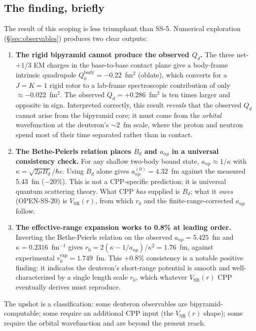 \documentclass[11pt,letterpaper]{article}
\newcommand{\Bd}{B_{d}}
\newcommand{\Qd}{Q_{d}}
\newcommand{\anp}{a_{np}}
\newcommand{\rzero}{r_{0}}
\newcommand{\VSR}{V_{\mathrm{SR}}}
\begin{document}
\subsection{The finding, briefly}

The result of this scoping is less triumphant than SS-5. Numerical exploration (§\ref{sec:observables}) produces two clear outputs:

\begin{enumerate}
\item \textbf{The rigid bipyramid cannot produce the observed $\Qd$.} The three net-$+1/3$ EM charges in the base-to-base contact plane give a body-frame intrinsic quadrupole $Q_0^{\mathrm{body}} = -0.22$~fm$^2$ (oblate), which converts for a $J=K=1$ rigid rotor to a lab-frame spectroscopic contribution of only $\approx -0.022$~fm$^2$. The observed $\Qd = +0.286$~fm$^2$ is ten times larger and opposite in sign. Interpreted correctly, this result \emph{reveals} that the observed $\Qd$ cannot arise from the bipyramid core; it must come from the \emph{orbital} wavefunction at the deuteron's ${\sim}2$~fm scale, where the proton and neutron spend most of their time separated rather than in contact.

\item \textbf{The Bethe-Peierls relation places $\Bd$ and $\anp$ in a universal consistency check.} For any shallow two-body bound state, $\anp \approx 1/\kappa$ with $\kappa = \sqrt{2\mu\Bd}/\hbar c$. Using $\Bd$ alone gives $\anp^{(0)} = 4.32$~fm against the measured 5.43~fm ($-20\%$). This is not a CPP-specific prediction; it is universal quantum scattering theory. What CPP \emph{has} supplied is $\Bd$; what it \emph{owes} (OPEN-SS-20) is $\VSR(r)$, from which $\rzero$ and the finite-range-corrected $\anp$ follow.

\item \textbf{The effective-range expansion works to 0.8\% at leading order.} Inverting the Bethe-Peierls relation on the observed $\anp = 5.425$~fm and $\kappa = 0.2316$~fm$^{-1}$ gives $\rzero = 2(\kappa - 1/\anp)/\kappa^2 = 1.76$~fm, against experimental $\rzero^{\mathrm{exp}} = 1.749$~fm. This $+0.8\%$ consistency is a notable positive finding: it indicates the deuteron's short-range potential is smooth and well-characterized by a single length scale $\rzero$, which whatever $\VSR(r)$ CPP eventually derives must reproduce.
\end{enumerate}

The upshot is a classification: some deuteron observables are bipyramid-computable; some require an additional CPP input (the $\VSR(r)$ shape); some require the orbital wavefunction and are beyond the present reach.
\end{document}

